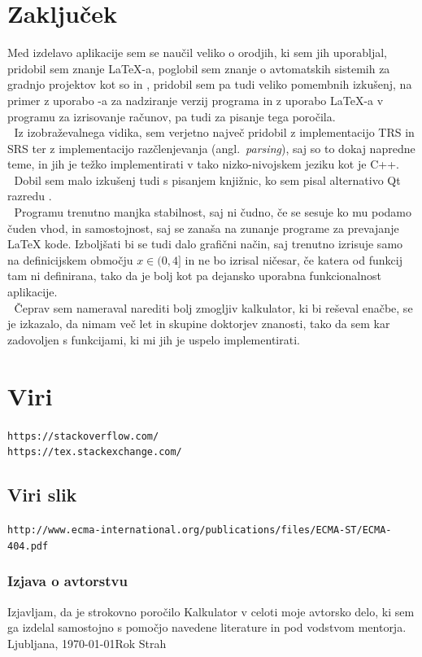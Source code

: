\documentclass[12pt]{report}
\newcommand{\wdot}{\textcolor{white}{.}}
\newcommand{\anglimp}[1]{angl.~\emph{#1}}
\newcommand{\angl}[1]{(\anglimp{#1})}
\newcommand{\odstavek}{\wdot \\ \wdot \qquad}
\newcommand{\codequote}[1]{\textquote{\texttt{#1}}}
\begin{document}
\chapter{Zaključek}
	Med izdelavo aplikacije sem se naučil veliko o orodjih, ki sem jih uporabljal, pridobil sem znanje \LaTeX-a, poglobil sem znanje o avtomatskih sistemih za gradnjo projektov kot so   in , pridobil sem pa tudi veliko pomembnih izkušenj, na primer z uporabo -a za nadziranje verzij programa in z uporabo \LaTeX-a v programu za izrisovanje računov, pa tudi za pisanje tega poročila.\odstavek
	Iz izobraževalnega vidika, sem verjetno največ pridobil z implementacijo TRS in SRS ter z implementacijo razčlenjevanja \angl{parsing}, saj so to dokaj napredne teme, in jih je težko implementirati v tako nizko-nivojskem jeziku kot je C++.\odstavek
	Dobil sem malo izkušenj tudi s pisanjem knjižnic, ko sem pisal alternativo Qt razredu \codequote{QTranslate}.\odstavek
	Programu trenutno manjka stabilnost, saj ni čudno, če se sesuje ko mu podamo čuden vhod, in samostojnost, saj se zanaša na zunanje programe za prevajanje \LaTeX{} kode. Izboljšati bi se tudi dalo grafični način, saj trenutno izrisuje samo na definicijskem območju $x \in (0, 4]$ in ne bo izrisal ničesar, če katera od funkcij tam ni definirana, tako da je bolj  kot pa dejansko uporabna funkcionalnost aplikacije. \odstavek
	Čeprav sem nameraval narediti bolj zmogljiv kalkulator, ki bi reševal enačbe, se je izkazalo, da nimam več let in skupine doktorjev znanosti, tako da sem kar zadovoljen s funkcijami, ki mi jih je uspelo implementirati.


\newpage
\chapter{Viri}
\printbibliography[heading=none]
\texttt{https://stackoverflow.com/}\\
\texttt{https://tex.stackexchange.com/}
\section{Viri slik}
\texttt{http://www.ecma-international.org/publications/files/ECMA-ST/ECMA-404.pdf}
\newpage
\pagestyle{empty}
\subsection*{Izjava o avtorstvu}
Izjavljam, da je strokovno poročilo Kalkulator v celoti moje avtorsko delo, ki sem ga izdelal samostojno s pomočjo navedene literature in pod vodstvom mentorja.\\[5cm]
Ljubljana, \today \hfill Rok Strah
\end{document}
